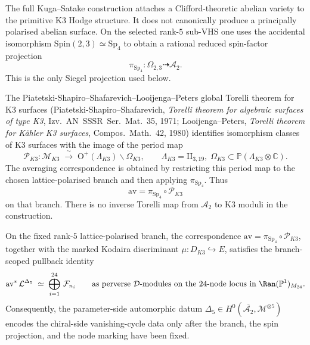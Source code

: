 \begin{proposition}
\label{prop:kuga-satake-step-bcb}
The full Kuga--Satake construction attaches a Clifford-theoretic abelian variety to the primitive K3 Hodge structure. It does not canonically produce a principally polarised abelian surface. On the selected rank-\(5\) sub-VHS one uses the accidental isomorphism \(\mathrm{Spin}(2,3)\simeq\mathrm{Sp}_4\) to obtain a rational reduced spin-factor projection
\[
 \pi_{\mathrm{Sp}_4}\colon \Omega_{2,3}\dashrightarrow \mathcal A_2.
\]
This is the only Siegel projection used below.
\end{proposition}

\begin{proposition}
\label{prop:torelli-k3-step-bcb}
The Piatetski-Shapiro--Shafarevich--Looijenga--Peters global Torelli theorem for K3 surfaces (Piatetski-Shapiro--Shafarevich, \emph{Torelli theorem for algebraic surfaces of type K3}, Izv.~AN~SSSR~Ser.~Mat.~35, 1971; Looijenga--Peters, \emph{Torelli theorem for K\"ahler K3 surfaces}, Compos.~Math.~42, 1980) identifies isomorphism classes of K3 surfaces with the image of the period map
\[
 \mathscr{P}_{K3}\colon
 \mathcal{M}_{K3}
 \;\xrightarrow{\;\sim\;}\;
 \mathrm{O}^+(\Lambda_{K3})\backslash \Omega_{K3},
 \qquad
 \Lambda_{K3} = \mathrm{II}_{3,19},\;
 \Omega_{K3}\subset \mathbb{P}(\Lambda_{K3}\otimes\mathbb{C}).
\]
The averaging correspondence is obtained by restricting this period map to the chosen lattice-polarised branch and then applying \(\pi_{\mathrm{Sp}_4}\). Thus
\[
 \mathrm{av}=\pi_{\mathrm{Sp}_4}\circ\mathscr P_{K3}
\]
on that branch. There is no inverse Torelli map from \(\mathcal A_2\) to K3 moduli in the construction.
\end{proposition}

\begin{proposition}
\label{prop:averaging-morphism-compatibility}
On the fixed rank-\(5\) lattice-polarised branch, the correspondence \(\mathrm{av}=\pi_{\mathrm{Sp}_4}\circ\mathscr P_{K3}\), together with the marked Kodaira discriminant \(\mu:D_{K3}\hookrightarrow E\), satisfies the branch-scoped pullback identity
\[
 \mathrm{av}^*\,\mathcal{L}^{\Delta_5}
 \;\simeq\;
 \bigoplus_{i=1}^{24}\,\mathcal{F}_{n_i}
 \qquad
 \text{as perverse $\mathcal{D}$-modules on the $24$-node locus in $\Ran(\mathbb{P}^1)_{M_{24}}$.}
\]
Consequently, the parameter-side automorphic datum \(\Delta_5\in H^0(\overline{\mathcal A_2},\mathcal M^{\otimes 5})\) encodes the chiral-side vanishing-cycle data only after the branch, the spin projection, and the node marking have been fixed.
\end{proposition}

